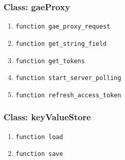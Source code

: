 \subsubsection{Class: gaeProxy}
\begin{enumerate}
    \item \verb|function gae_proxy_request|
    \item \verb|function get_string_field|
    \item \verb|function get_tokens|
    \item \verb|function start_server_polling|
    \item \verb|function refresh_access_token|
\end{enumerate}
\subsubsection{Class: keyValueStore}
\begin{enumerate}
    \item \verb|function load| 
    \item \verb|function save| 
\end{enumerate}

